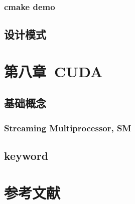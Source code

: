 \documentclass[12pt]{book}
\begin{document}
\subsection{cmake demo}
\section{设计模式}

\newpage

\fancyhead{}

\chapter{第八章\ CUDA}

\section{基础概念}
\subsection{Streaming Multiprocessor, SM}

\section{keyword}
\newpage
 
\fancyhead{}
 

 
\chapter{参考文献}


 
\end{document}
